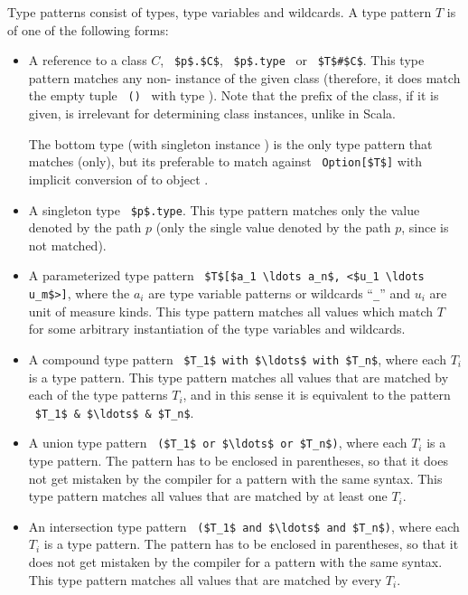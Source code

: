 Type patterns consist of types, type variables and wildcards. A type pattern $T$ is of one of the following forms: 
\begin{itemize}
  \item[] A reference to a class $C$, ~\lstinline!$p$.$C$!, ~\lstinline!$p$.type!~ or ~\lstinline!$T$#$C$!. This type pattern matches any non- instance of the given class (therefore, it does match the empty tuple ~\lstinline!()!~ with type ). Note that the prefix of the class, if it is given, is irrelevant for determining class instances, unlike in Scala. 

  The bottom type  (with singleton instance ) is the only type pattern that matches  (only), but its preferable to match against ~\lstinline!Option[$T$]! with implicit conversion of  to object . 

  \item[] A singleton type ~\lstinline!$p$.type!. This type pattern matches only the value denoted by the path $p$ (only the single value denoted by the path $p$, since  is not matched). 

  \item[] A parameterized type pattern ~\lstinline!$T$[$a_1 \ldots a_n$, <$u_1 \ldots u_m$>]!, where the $a_i$ are type variable patterns or wildcards ``\lstinline!_!'' and $u_i$ are unit of measure kinds. This type pattern matches all values which match $T$ for some arbitrary instantiation of the type variables and wildcards.  

  \item[] A compound type pattern ~\lstinline!$T_1$ with $\ldots$ with $T_n$!, where each $T_i$ is a type pattern. This type pattern matches all values that are matched by each of the type patterns $T_i$, and in this sense it is equivalent to the pattern ~\lstinline!$T_1$ & $\ldots$ & $T_n$!. 

  \item[] A union type pattern ~\lstinline!($T_1$ or $\ldots$ or $T_n$)!, where each $T_i$ is a type pattern. The pattern has to be enclosed in parentheses, so that it does not get mistaken by the compiler for a pattern with the same syntax. This type pattern matches all values that are matched by at least one $T_i$. 

  \item[] An intersection type pattern ~\lstinline!($T_1$ and $\ldots$ and $T_n$)!, where each $T_i$ is a type pattern. The pattern has to be enclosed in parentheses, so that it does not get mistaken by the compiler for a pattern with the same syntax. This type pattern matches all values that are matched by every $T_i$. 
\end{itemize}

